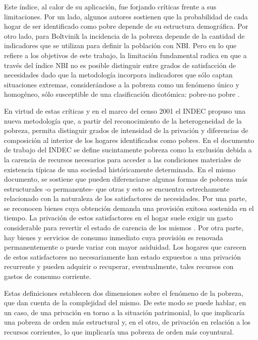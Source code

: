 Este índice, al calor de su aplicación, fue forjando críticas frente a sus limitaciones. Por un lado, algunos autores sostienen \cite{alvarez1997} que la probabilidad de cada hogar de ser identificado como pobre depende de su estructura demográfica. Por otro lado, para Boltvinik \citeyear{boltvinik1992} la incidencia de la pobreza depende de la cantidad de indicadores que se utilizan para definir la población con NBI. Pero en lo que refiere a los objetivos de este trabajo, la limitación fundamental radica en que a través del índice NBI no es posible distinguir entre grados de satisfacción de necesidades dado que la metodología incorpora indicadores que sólo captan situaciones extremas, considerándose a la pobreza como un fenómeno único y homogéneo, sólo susceptible de una clasificación dicotómica: pobre-no pobre \cite{indec1996,minujin}. 

En virtud de estas críticas y en el marco del censo 2001 el INDEC propuso una nueva metodología que, a partir del reconocimiento de la heterogeneidad de la pobreza, permita distinguir grados de intensidad de la privación y diferencias de composición al interior de los hogares identificados como pobres. En el documento de trabajo del INDEC \citeyear{indec2003c}  se define sucintamente pobreza como la exclusión debida a la carencia de recursos necesarios para acceder a las condiciones materiales de existencia típicas de una sociedad históricamente determinada. En el mismo documento, se sostiene que pueden diferenciarse algunas formas de pobreza más estructurales -o permanentes- que otras y esto se encuentra estrechamente relacionado con la naturaleza de los satisfactores de necesidades. Por una parte, se reconocen bienes cuya obtención demanda una provisión exitosa sostenida en el tiempo. La privación de estos satisfactores en el hogar suele exigir un gasto considerable para revertir el estado de carencia de los mismos \cite{katzman,boltvinik1990}. Por otra parte, hay bienes y servicios de consumo inmediato cuya provisión es renovada permanentemente o puede variar con mayor asiduidad. Los hogares que carecen de estos satisfactores no necesariamente han estado expuestos a una privación recurrente y pueden adquirir o recuperar, eventualmente, tales recursos con gastos de consumo corriente.

Estas definiciones establecen dos dimensiones sobre el fenómeno de la pobreza, que dan cuenta de la complejidad del mismo. De este modo se puede hablar, en un caso, de una privación en torno a la situación patrimonial, lo que implicaría una pobreza de orden más estructural y, en el otro, de privación en relación a los recursos corrientes, lo que implicaría una pobreza de orden más coyuntural.

